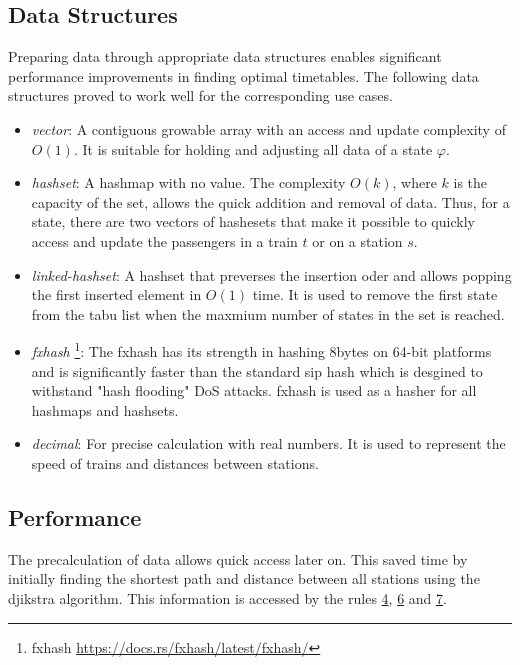 \documentclass[a4paper,10pt,parskip]{article}
\begin{document}
\subsection{Data Structures}

Preparing data through appropriate data structures enables significant performance 
improvements in finding optimal timetables. The following data structures proved 
to work well for the corresponding use cases.

\begin{itemize}
    \item \emph{vector}: A contiguous growable array with an access and update 
    complexity of $O(1)$. It is suitable for holding and adjusting all data of a 
    state $\varphi$.
    \item \emph{hashset}: A hashmap with no value. The complexity $O(k)$, where 
    $k$ is the capacity of the set, allows the quick addition and removal of data.
    Thus, for a state, there are two vectors of hashesets that make it possible 
    to quickly access and update the passengers in a train $t$ or on a station $s$.
    \item \emph{linked-hashset}: A hashset that preverses the insertion oder and 
    allows popping the first inserted element in $O(1)$ time. It is used to remove 
    the first state from the tabu list when the maxmium number of states in the set 
    is reached.
    \item \emph{fxhash} \footnote{fxhash \url{https://docs.rs/fxhash/latest/fxhash/}}: 
    The fxhash has its strength in hashing 8bytes on 64-bit platforms and is 
    significantly faster than the standard sip hash which is desgined to withstand 
    "hash flooding" DoS attacks. fxhash is used as a hasher for all hashmaps and 
    hashsets.
    \item \emph{decimal}: For precise calculation with real numbers. It is used 
    to represent the speed of trains and distances between stations.
\end{itemize}

\subsection{Performance}

The precalculation of data allows quick access later on. This saved time by initially
finding the shortest path and distance between all stations using the djikstra 
algorithm. This information is accessed by the rules \hyperref[rule:4]{4}, 
\hyperref[rule:6]{6} and \hyperref[rule:7]{7}.
\end{document}
